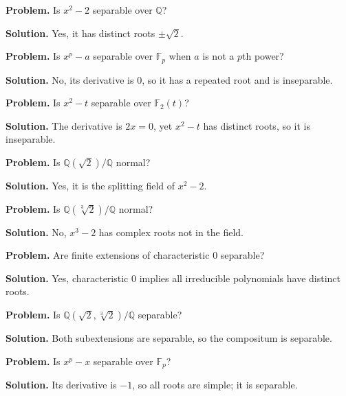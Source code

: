 \begin{example}\label{ex:sec5-1}
\textbf{Problem.} Is $x^2-2$ separable over $\mathbb{Q}$?

\textbf{Solution.} Yes, it has distinct roots $\pm\sqrt{2}$.
\end{example}

\begin{example}\label{ex:sec5-2}
\textbf{Problem.} Is $x^p-a$ separable over $\mathbb{F}_p$ when $a$ is not a $p$th power?

\textbf{Solution.} No, its derivative is $0$, so it has a repeated root and is inseparable.
\end{example}

\begin{example}\label{ex:sec5-3}
\textbf{Problem.} Is $x^2-t$ separable over $\mathbb{F}_2(t)$?

\textbf{Solution.} The derivative is $2x=0$, yet $x^2-t$ has distinct roots, so it is inseparable.
\end{example}

\begin{example}\label{ex:sec5-4}
\textbf{Problem.} Is $\mathbb{Q}(\sqrt{2})/\mathbb{Q}$ normal?

\textbf{Solution.} Yes, it is the splitting field of $x^2-2$.
\end{example}

\begin{example}\label{ex:sec5-5}
\textbf{Problem.} Is $\mathbb{Q}(\sqrt[3]{2})/\mathbb{Q}$ normal?

\textbf{Solution.} No, $x^3-2$ has complex roots not in the field.
\end{example}

\begin{example}\label{ex:sec5-6}
\textbf{Problem.} Are finite extensions of characteristic $0$ separable?

\textbf{Solution.} Yes, characteristic $0$ implies all irreducible polynomials have distinct roots.
\end{example}

\begin{example}\label{ex:sec5-7}
\textbf{Problem.} Is $\mathbb{Q}(\sqrt{2},\sqrt[3]{2})/\mathbb{Q}$ separable?

\textbf{Solution.} Both subextensions are separable, so the compositum is separable.
\end{example}

\begin{example}\label{ex:sec5-8}
\textbf{Problem.} Is $x^p-x$ separable over $\mathbb{F}_p$?

\textbf{Solution.} Its derivative is $-1$, so all roots are simple; it is separable.
\end{example}

